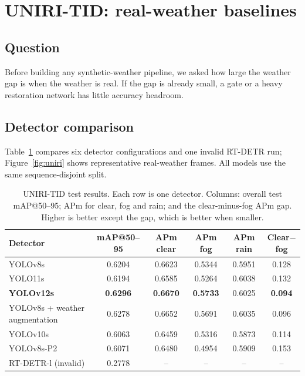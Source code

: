 \documentclass[11pt,a4paper]{article}
\begin{document}
\section{UNIRI-TID: real-weather baselines}
\label{sec:uniri}

\subsection{Question}
Before building any synthetic-weather pipeline, we asked how large the weather
gap is when the weather is real. If the gap is already small, a gate or a
heavy restoration network has little accuracy headroom.


\subsection{Detector comparison}
Table~\ref{tab:uniri} compares six detector configurations and one invalid
RT-DETR run; Figure~\ref{fig:uniri} shows representative real-weather frames. All models use the same sequence-disjoint split.

\begin{table}[H]
\centering
\small
\caption{UNIRI-TID test results. Each row is one detector. Columns: overall test
mAP@50--95; APm for clear, fog and rain; and the clear-minus-fog APm gap. Higher
is better except the gap, which is better when smaller.}
\label{tab:uniri}
\begin{tabular}{@{}lccccc@{}}
\toprule
Detector & mAP@50--95 & APm clear & APm fog & APm rain & Clear$-$fog \\
\midrule
YOLOv8s                       & 0.6204 & 0.6623 & 0.5344 & 0.5951 & 0.128 \\
YOLO11s                       & 0.6194 & 0.6585 & 0.5264 & 0.6038 & 0.132 \\
\textbf{YOLOv12s}             & \textbf{0.6296} & \textbf{0.6670} & \textbf{0.5733} & 0.6025 & \textbf{0.094} \\
YOLOv8s + weather augmentation& 0.6278 & 0.6652 & 0.5691 & 0.6035 & 0.096 \\
YOLOv10s                      & 0.6063 & 0.6459 & 0.5316 & 0.5873 & 0.114 \\
YOLOv8s-P2                    & 0.6071 & 0.6480 & 0.4954 & 0.5909 & 0.153 \\
RT-DETR-l (invalid)           & 0.2778 & -- & -- & -- & -- \\
\bottomrule
\end{tabular}
\end{table}
\end{document}
